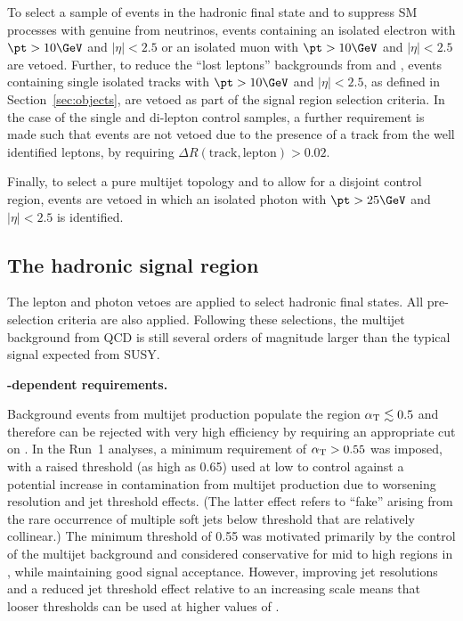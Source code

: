 To select a sample of events in the hadronic final state and to
suppress SM processes with genuine \met from neutrinos, events
containing an isolated electron with $\pt > 10\GeV$ and $|\eta| < 2.5$
or an isolated muon with $\pt > 10\GeV$ and $|\eta| < 2.5$ are
vetoed. Further, to reduce the ``lost leptons'' backgrounds from \wj
and \ttbar, events containing single isolated tracks with $\pt >
10\GeV$ and $|\eta| < 2.5$, as defined in Section~\ref{sec:objects},
are vetoed as part of the signal region selection criteria. In the
case of the single and di-lepton control samples, a further
requirement is made such that events are not vetoed due to the
presence of a track from the well identified leptons, by requiring
$\Delta R(\textrm{track},\textrm{lepton}) > 0.02$.

Finally, to select a pure multijet topology and to allow for a
disjoint control region, events are vetoed in which an isolated photon
with $\pt > 25\GeV$ and $|\eta| < 2.5$ is identified.

\subsection{The hadronic signal region}
\label{sec:had-signal}

The lepton and photon vetoes are applied to select hadronic final
states. All pre-selection criteria are also applied. Following these
selections, the multijet background from QCD is still several orders
of magnitude larger than the typical signal expected from SUSY.

{\bf \HT-dependent \alphat requirements.}

Background events from multijet production populate the region
$\alpha_{\text{T}} \lesssim 0.5$ and therefore can be rejected with very high
efficiency by requiring an appropriate cut on \alphat. In the Run~1
analyses, a minimum requirement of $\alpha_{\text{T}} > 0.55$ was imposed, with
a raised threshold (as high as 0.65) used at low \HT to control
against a potential increase in contamination from multijet production
due to worsening resolution and jet \PT threshold effects.  (The
latter effect refers to ``fake'' \mht arising from the rare occurrence
of multiple soft jets below threshold that are relatively collinear.)
The minimum threshold of 0.55 was motivated primarily by the control
of the multijet background and considered conservative for mid to high
regions in \HT, while maintaining good signal acceptance. However,
improving jet resolutions and a reduced jet threshold effect relative
to an increasing \HT scale means that looser \alphat thresholds can be
used at higher values of \HT.

